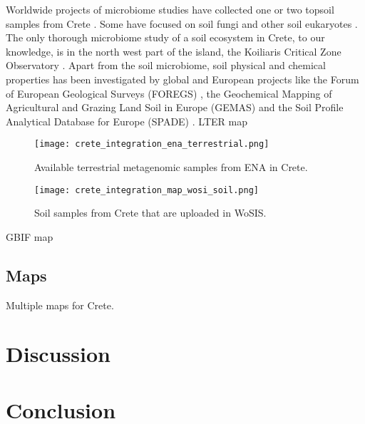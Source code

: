 Worldwide projects of microbiome studies have collected one or two topsoil
samples from Crete \parencite{Vasar2022, Labouyrie2023, Bahram2018, Orgiazzi2018}.
Some have focused on soil fungi \parencite{Mikryukov2023, Davison2021, Tedersoo2021}
and other soil eukaryotes \parencite{Aslani2022}.
The only thorough microbiome study of a soil ecosystem in Crete, to our knowledge,
is in the north west part of the island, the Koiliaris Critical Zone Observatory \parencite{tsiknia2014}.
Apart from the soil microbiome, soil physical and chemical properties has been
investigated by global and European projects like the Forum of European Geological Surveys
(FOREGS) \parencite{nerc19017}, the Geochemical Mapping of Agricultural and Grazing Land
Soil in Europe (GEMAS) \parencite{REIMANN2018302} and the Soil Profile Analytical
Database for Europe (SPADE) \parencite{Hiederer2006}.
LTER map

\begin{figure}[h] 
    \centering\texttt{[image: crete\_integration\_ena\_terrestrial.png]}
    \caption{Available terrestrial metagenomic samples from ENA in Crete.}
    \label{fig:isd_crete_ena}
\end{figure}


\begin{figure}[h] 
    \centering\texttt{[image: crete\_integration\_map\_wosi\_soil.png]}
    \caption{Soil samples from Crete that are uploaded in WoSIS.}
    \label{fig:isd_crete_wosis}
\end{figure}

GBIF map 


\subsection{Maps}

Multiple maps for Crete.


\section{Discussion}\label{crete_idea_discussion}

\section{Conclusion}




